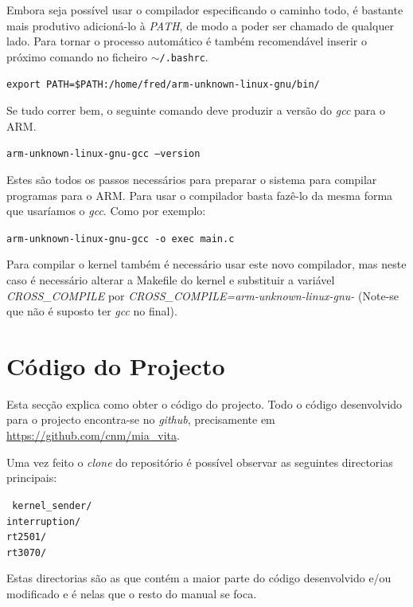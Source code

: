 \documentclass[10pt,a4paper,oneside]{book}
\begin{document}
Embora seja possível usar o compilador especificando o caminho todo, é bastante mais produtivo adicioná-lo à \emph{PATH}, de modo a poder ser chamado de qualquer lado. Para tornar o processo automático é também recomendável inserir o próximo comando no ficheiro {\tt $\sim$/.bashrc}.

\begin{center}
{\tt export PATH=\$PATH:/home/fred/arm-unknown-linux-gnu/bin/}
\end{center}

Se tudo correr bem, o seguinte comando deve produzir a versão do \emph{gcc} para o ARM.

\begin{center}
{\tt arm-unknown-linux-gnu-gcc --version}
\end{center}

Estes são todos os passos necessários para preparar o sistema para compilar programas para o ARM. Para usar o compilador basta fazê-lo da mesma forma que usaríamos o \emph{gcc}. Como por exemplo:

\begin{center}
{\tt arm-unknown-linux-gnu-gcc -o exec main.c}
\end{center}

Para compilar o kernel também é necessário usar este novo compilador, mas neste caso é necessário alterar a Makefile do kernel e substituir a variável \emph{CROSS\_COMPILE} por \emph{CROSS\_COMPILE=arm-unknown-linux-gnu-} (Note-se que não é suposto ter \emph{gcc} no final).

\section{Código do Projecto}

Esta secção explica como obter o código do projecto. Todo o código desenvolvido para o projecto encontra-se no \emph{github}, precisamente em \href{https://github.com/cnm/mia\_vita}{https://github.com/cnm/mia\_vita}. 

Uma vez feito o \emph{clone} do repositório é possível observar as seguintes directorias principais:

\begin{flushleft}
  {\tt
    kernel\_sender/\\
    interruption/\\
    rt2501/\\
    rt3070/
  }
\end{flushleft}

Estas directorias são as que contém a maior parte do código desenvolvido e/ou modificado e é nelas que o resto do manual se foca.
\end{document}
